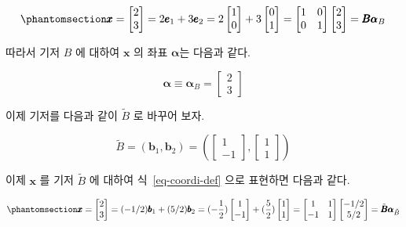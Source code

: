 \documentclass[
  11pt,
  a4paper,
  oneside]{scrbook}
\theoremstyle{definition}
\theoremstyle{definition}
\theoremstyle{plain}
\theoremstyle{remark}
\begin{document}
\begin{equation}\phantomsection\label{eq-coordi-ex1}{
\pmb x 
=\begin{bmatrix}
2 \\
3
\end{bmatrix}
= 2 \pmb e_1 + 3 \pmb e_2 
= 2
\begin{bmatrix}
1 \\
0
\end{bmatrix}
+ 3
\begin{bmatrix}
0 \\
1
\end{bmatrix}
=
\begin{bmatrix}
1 & 0\\
0 & 1
\end{bmatrix}
\begin{bmatrix}
2 \\
3
\end{bmatrix}
=\pmb B \pmb \alpha_B 
}\end{equation}

따라서 기저 \(B\) 에 대하여 \(\pmb x\) 의 좌표 \(\pmb \alpha\)는 다음과
같다.

\[
\pmb \alpha \equiv \pmb \alpha_B = 
\begin{bmatrix}
2 \\
3
\end{bmatrix}
\]

이제 기저를 다음과 같이 \(\tilde B\) 로 바꾸어 보자.

\[ \tilde B=  (\pmb b_1, \pmb b_2) =
\left (
\begin{bmatrix}
1 \\
-1
\end{bmatrix}
,
\begin{bmatrix}
1 \\
1
\end{bmatrix}
\right )
\]

이제 \(\pmb x\) 를 기저 \(\tilde B\) 에 대하여 식~\ref{eq-coordi-def}
으로 표현하면 다음과 같다.

\begin{equation}\phantomsection\label{eq-coordi-ex2}{
\pmb x =
\begin{bmatrix}
2 \\
3
\end{bmatrix}
= (-1/2) \pmb b_1 + (5/2) \pmb b_2 
= (-\frac{1}{2})
\begin{bmatrix}
1 \\
-1
\end{bmatrix}
+ (\frac{5}{2})
\begin{bmatrix}
1 \\
1
\end{bmatrix}
=
\begin{bmatrix}
1 & 1\\
-1 & 1
\end{bmatrix}
\begin{bmatrix}
-1/2 \\
5/2
\end{bmatrix}
= \tilde {\pmb B}  \pmb \alpha_{\tilde B}
}\end{equation}
\end{document}
